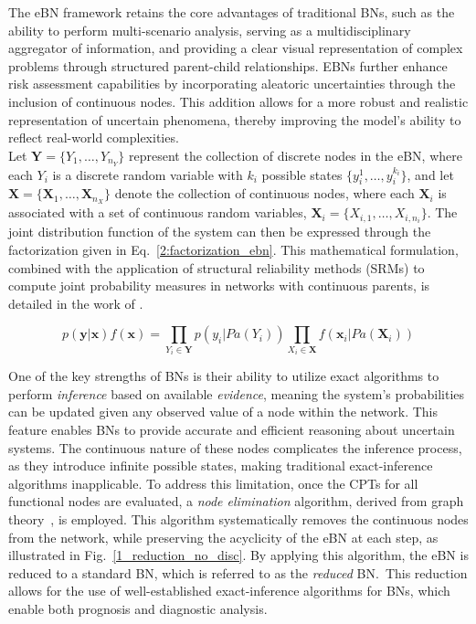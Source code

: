The eBN framework retains the core advantages of traditional BNs, such as the ability to perform multi-scenario analysis, serving as a multidisciplinary aggregator of information, and providing a clear visual representation of complex problems through structured parent-child relationships. 
EBNs further enhance risk assessment capabilities by incorporating aleatoric uncertainties through the inclusion of continuous nodes.
This addition allows for a more robust and realistic representation of uncertain phenomena, thereby improving the model's ability to reflect real-world complexities.\\

Let $\mathbf{Y} = \{Y_1, \ldots, Y_{n_Y}\}$ represent the collection of discrete nodes in the eBN, where each $Y_i$ is a discrete random variable with $k_i$ possible states $\{y_i^1, \ldots, y_i^{k_i}\}$, and let $\mathbf{X} = \{\mathbf{X}_1, \ldots, \mathbf{X}_{n_X}\}$ denote the collection of continuous nodes, where each $\mathbf{X}_i$ is associated with a set of continuous random variables, $\mathbf{X}_i = \{X_{i,1}, \ldots, X_{i,n_i}\}$. 
The joint distribution function of the system can then be expressed through the factorization given in Eq.~\ref{2:factorization_ebn}. 
This mathematical formulation, combined with the application of structural reliability methods (SRMs) to compute joint probability measures in networks with continuous parents, is detailed in the work of \textcite{straub_bayesian_2010}.

\begin{equation}
    \label{2:factorization_ebn}
    p(\mathbf{y}|\mathbf{x})f(\mathbf{x}) = \prod_{Y_i\in \mathbf{Y}} p(y_i|Pa(Y_i)) \prod_{X_i\in \mathbf{X}} f(\mathbf{x}_i|Pa(\mathbf{X}_i)) 
\end{equation}

One of the key strengths of BNs is their ability to utilize exact algorithms to perform \textit{inference} based on available \textit{evidence}, meaning the system's probabilities can be updated given any observed value of a node within the network.
This feature enables BNs to provide accurate and efficient reasoning about uncertain systems. 
The continuous nature of these nodes complicates the inference process, as they introduce infinite possible states, making traditional exact-inference algorithms inapplicable.  
To address this limitation, once the CPTs for all functional nodes are evaluated, a \textit{node elimination} algorithm, derived from graph theory~\cite{Shachter86a}, is employed. 
This algorithm systematically removes the continuous nodes from the network, while preserving the acyclicity of the eBN at each step, as illustrated in Fig.~\ref{1_reduction_no_disc}. 
By applying this algorithm, the eBN is reduced to a standard BN, which is referred to as the \textit{reduced} BN.\ This reduction allows for the use of well-established exact-inference algorithms for BNs, which enable both prognosis and diagnostic analysis. \\

